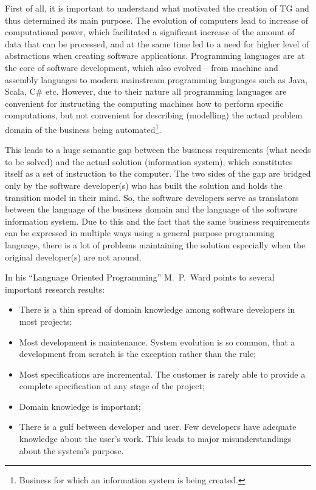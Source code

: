   First of all, it is important to understand what motivated the creation of TG and thus determined its main purpose.
  The evolution of computers lead to increase of computational power, which facilitated a significant increase of the amount of data that can be processed, and at the same time led to a need for higher level of abstractions when creating software applications.
  Programming languages are at the core of software development, which also evolved -- from machine and assembly languages to modern mainstream programming languages such as Java, Scala, C\# etc.
  However, due to their nature all programming languages are convenient for instructing the computing machines how to perform specific computations, but not convenient for describing (modelling) the actual problem domain of the business being automated\footnote{Business for which an information system is being created.}.
  
  This leads to a huge semantic gap between the business requirements (what needs to be solved) and the actual solution (information system), which constitutes itself as a set of instruction to the computer.
  The two sides of the gap are bridged only by the software developer(s) who has built the solution and holds the transition model in their mind.
  So, the software developers serve as translators between the language of the business domain and the language of the software information system.
  Due to this and the fact that the same business requirements can be expressed in multiple ways using a general purpose programming language, there is a lot of problems maintaining the solution especially when the original developer(s) are not around.

  In his ``Language Oriented Programming'' M.~P.~Ward points to several important research results:
  \begin{itemize}
    \item There is a thin spread of domain knowledge among software developers in most projects;    
    \item Most development is maintenance. 
	  System evolution is so common, that a development from scratch is the exception rather than the rule;
    \item Most specifications are incremental. 
	  The customer is rarely able to provide a complete specification at any stage of the project;
    \item Domain knowledge is important;
    \item There is a gulf between developer and user. 
	  Few developers have adequate knowledge about the user's work. 
	  This leads to major misunderstandings about the system's purpose.
  \end{itemize}
  
